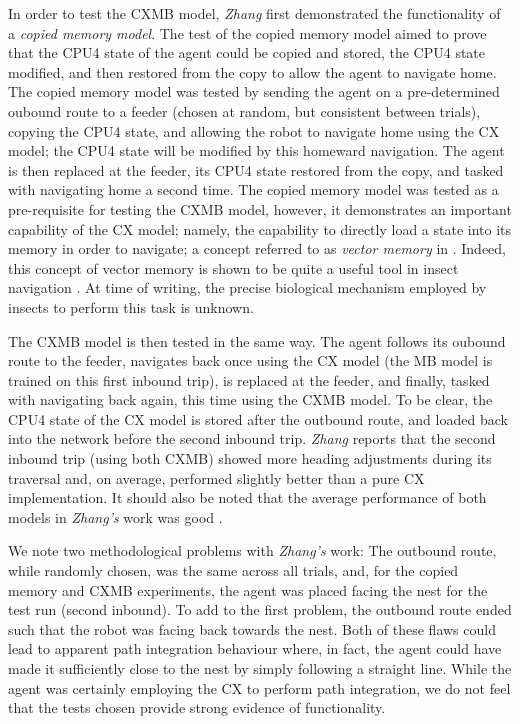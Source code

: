 \documentclass[a4paper,11pt,twoside,openright]{article}
\begin{document}
In order to test the CXMB model, \textit{Zhang} first demonstrated the
functionality of a \textit{copied memory model}. The test of the
copied memory model aimed to prove that the CPU4 state of the agent
could be copied and stored, the CPU4 state modified, and then restored
from the copy to allow the agent to navigate home. The copied memory
model was tested by sending the agent on a pre-determined oubound
route to a feeder (chosen at random, but consistent between trials),
copying the CPU4 state, and allowing the robot to navigate home using
the CX model; the CPU4 state will be modified by this homeward
navigation.  The agent is then replaced at the feeder, its CPU4 state
restored from the copy, and tasked with navigating home a second
time. The copied memory model was tested as a pre-requisite for
testing the CXMB model, however, it demonstrates an important
capability of the CX model; namely, the capability to directly load a
state into its memory in order to navigate; a concept referred to as
\textit{vector memory} in \cite{Webb2019}. Indeed, this concept of
vector memory is shown to be quite a useful tool in insect navigation
\cite{Webb2019}. At time of writing, the precise biological mechanism
employed by insects to perform this task is unknown.
\newline
\par

The CXMB model is then tested in the same way. The agent follows its oubound
route to the feeder, navigates back once using the CX model (the MB model is
trained on this first inbound trip), is replaced at the
feeder, and finally, tasked with navigating back again, this time using the CXMB
model. To be clear, the CPU4 state of the CX model is stored after the outbound
route, and loaded back into the network before the second inbound trip.
\textit{Zhang} reports that the second inbound trip (using both CXMB) showed
more heading adjustments during its traversal and, on average, performed
slightly better than a pure CX implementation\cite{Zhang2017}. It should also
be noted that the average performance of both models in \textit{Zhang's} work
was good \cite{Zhang2017}.
\newline
\par

We note two methodological problems with \textit{Zhang's} work: The outbound
route, while randomly chosen, was the same across all trials, and, for the
copied memory and CXMB experiments, the agent was placed facing the nest for
the test run (second inbound). To add to the first problem, the outbound route
ended such that the robot was facing back towards the nest. Both of these flaws
could lead to apparent path integration behaviour where, in fact, the agent
could have made it sufficiently close to the nest by simply following a straight
line. While the agent was certainly employing the CX to perform path integration,
we do not feel that the tests chosen provide strong evidence of functionality.
\end{document}
